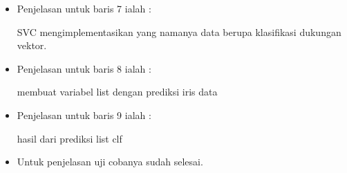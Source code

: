 \begin{itemize}
\begin{itemize}
\begin{enumerate}
\begin{itemize}
\begin{itemize}
\item Penjelasan untuk baris 7 ialah : 
\par SVC mengimplementasikan yang namanya data berupa klasifikasi dukungan vektor.
\par
\par
\item Penjelasan untuk baris 8 ialah :
\par membuat variabel list dengan prediksi iris data 
\par
\item Penjelasan untuk baris 9 ialah :
\par hasil dari prediksi list clf
\par
\item Untuk penjelasan uji cobanya sudah selesai.
\par
\end{itemize}
\end{itemize}
\end{enumerate}


\end{itemize}
\end{itemize}
